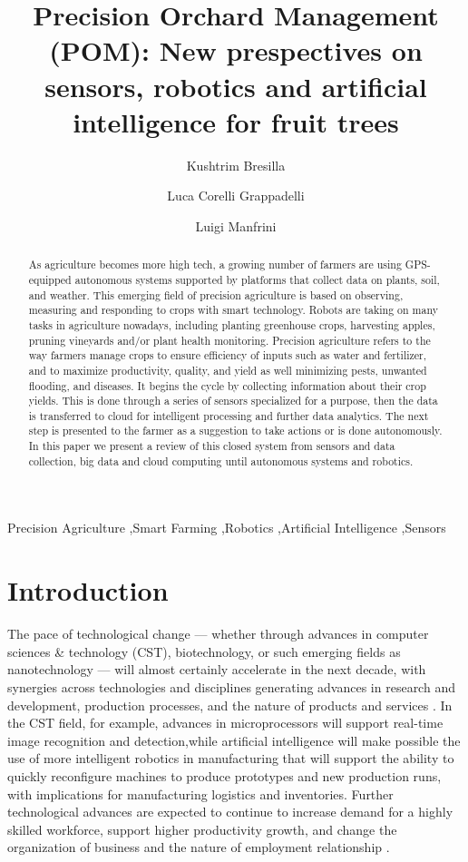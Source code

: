 \documentclass[review]{elsarticle}
\begin{document}
\begin{frontmatter}
\title{Precision Orchard Management (POM): New prespectives on sensors, robotics and artificial intelligence for fruit trees}
\author[1,2]{Kushtrim Bresilla}
\author[1]{Luca Corelli Grappadelli}
\author[1,2]{Luigi Manfrini}
\address[1]{Department of Agricultural Sciences, University of Bologna}
\begin{abstract}
    As agriculture becomes more high tech, a growing number of farmers are using GPS-equipped autonomous systems supported by platforms that collect data on plants, soil, and weather. This emerging field of precision agriculture is based on observing, measuring and responding to crops with smart technology. Robots are taking on many tasks in agriculture nowadays, including planting greenhouse crops, harvesting apples, pruning vineyards and/or plant health monitoring. Precision agriculture refers to the way farmers manage crops to ensure efficiency of inputs such as water and fertilizer, and to maximize productivity, quality, and yield as well minimizing pests, unwanted flooding, and diseases. It begins the cycle by collecting information about their crop yields. This is done through a series of sensors specialized for a purpose, then the data is transferred to cloud for intelligent processing and further data analytics. The next step is presented to the farmer as a suggestion to take actions or is done autonomously. In this paper we present a review of this closed system from sensors and data collection, big data and cloud computing until autonomous systems and robotics.

\end{abstract}
\begin{keyword}
    Precision Agriculture \sep Smart Farming \sep Robotics \sep Artificial Intelligence \sep Sensors
\end{keyword}
\end{frontmatter}
\linenumbers



\section{Introduction}
\label{S:1}

The pace of technological change — whether through advances in computer sciences \& technology (CST), biotechnology, or such emerging fields as nanotechnology \cite{Duhan_2017} — will almost certainly accelerate in the next decade, with synergies across technologies and disciplines generating advances in research and development, production processes, and the nature of products and services \cite{Harrison_2015}. In the CST field, for example, advances in microprocessors will support real-time image recognition and detection,while artificial intelligence will make possible the use of more intelligent robotics in manufacturing that will support the ability to quickly reconfigure machines to produce prototypes and new production runs, with implications for manufacturing logistics and inventories. Further technological advances are expected to continue to increase demand for a highly skilled workforce, support higher productivity growth, and change the organization of business and the nature of employment relationship \cite{de_Lima_2017}.
\end{document}
